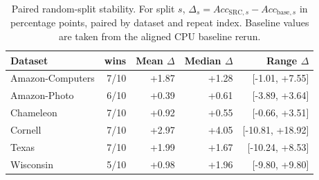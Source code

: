 \begin{table}[t]
\centering
\small
\caption{Paired random-split stability. For split $s$, $\Delta_s = Acc_{\mathrm{SRC},s}-Acc_{\mathrm{base},s}$ in percentage points, paired by dataset and repeat index. Baseline values are taken from the aligned CPU baseline rerun.}
\label{tab:stability-win}
\begin{tabular}{lrrrr}
\toprule
Dataset & \SRC{} wins & Mean $\Delta$ & Median $\Delta$ & Range $\Delta$ \\
\midrule
Amazon-Computers & 7/10 & +1.87 & +1.28 & [-1.01, +7.55] \\
Amazon-Photo & 6/10 & +0.39 & +0.61 & [-3.89, +3.64] \\
Chameleon & 7/10 & +0.92 & +0.55 & [-0.66, +3.51] \\
Cornell & 7/10 & +2.97 & +4.05 & [-10.81, +18.92] \\
Texas & 7/10 & +1.99 & +1.67 & [-10.24, +8.53] \\
Wisconsin & 5/10 & +0.98 & +1.96 & [-9.80, +9.80] \\
\bottomrule
\end{tabular}
\end{table}
